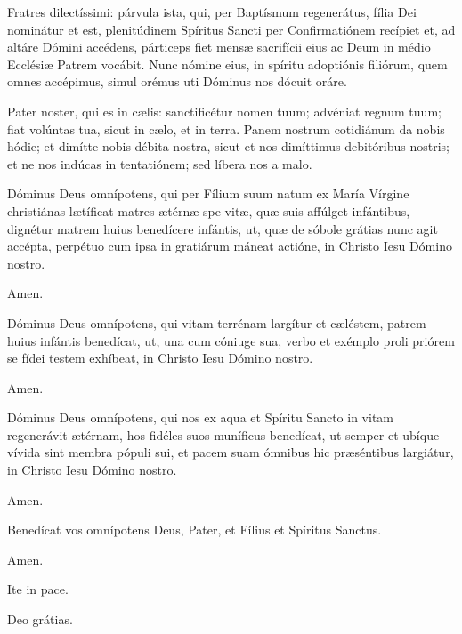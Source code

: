 

Fratres dilectíssimi: párvula ista, qui, per Baptísmum regenerátus,
fília Dei nominátur et est, plenitúdinem Spíritus
Sancti per Confirmatiónem recípiet et, ad altáre Dómini accédens,
párticeps fiet mensæ sacrifícii eius ac Deum in médio
Ecclésiæ Patrem vocábit. Nunc nómine eius, in spíritu adoptiónis
filiórum, quem omnes accépimus, simul orémus uti Dóminus nos dócuit
oráre.

Pater noster, qui es in cælis:
sanctificétur nomen tuum;
advéniat regnum tuum;
fiat volúntas tua, sicut in cælo, et in terra.
Panem nostrum cotidiánum da nobis hódie;
et dimítte nobis débita nostra,
sicut et nos dimíttimus debitóribus nostris;
et ne nos indúcas in tentatiónem;
sed líbera nos a malo.



Dóminus Deus omnípotens, qui per Fílium suum natum ex María Vírgine christiánas
lætíficat matres ætérnæ spe vitæ, quæ suis affúlget infántibus, dignétur matrem huius
benedícere infántis, ut, quæ de sóbole grátias nunc agit accépta, perpétuo cum ipsa
in gratiárum máneat actióne, in Christo Iesu Dómino nostro.

 Amen.

 Dóminus Deus omnípotens, qui vitam terrénam largítur et cæléstem, patrem huius infántis
benedícat, ut, una cum cóniuge sua, verbo et exémplo proli priórem se fídei testem exhíbeat,
in Christo Iesu Dómino nostro.

 Amen.

 Dóminus Deus omnípotens, qui nos ex aqua et Spíritu Sancto in vitam regenerávit
ætérnam, hos fidéles suos muníficus benedícat, ut semper et ubíque vívida sint membra pópuli sui,
et pacem suam ómnibus hic præséntibus largiátur, in Christo Iesu Dómino nostro.

 Amen.

 Benedícat vos omnípotens Deus,
Pater, et Fílius \grecross{} et Spíritus Sanctus.

 Amen.

 Ite in pace.

 Deo grátias.
